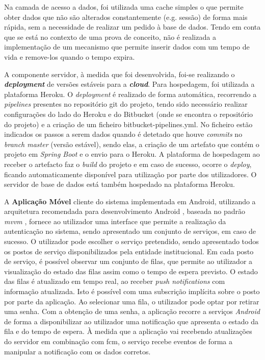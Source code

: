 {Na camada de acesso a dados, foi utilizada uma cache simples o que permite obter dados que não são alterados constantemente (e.g. sessão) de forma mais rápida, sem a necessidade de realizar um pedido à base de dados. Tendo em conta que se está no contexto de uma prova de conceito, não é realizada a implementação de um mecanismo que permite inserir dados com um tempo de vida e remove-los quando o tempo expira. 

A componente servidor, à medida que foi desenvolvida, foi-se realizando o \textbf{\textit{deployment}} de versões estáveis para a \textbf{\textit{cloud}}. Para hospedagem, foi utilizada a plataforma Heroku. O \textit{deployment} é realizado de forma automática, recorrendo a \textit{pipelines} presentes no repositório git do projeto, tendo sido necessário realizar configurações do lado do Heroku e do Bitbucket (onde se encontra o repositório do projeto) e a criação de um ficheiro bitbucket-pipelines.yml. No ficheiro estão indicados os passos a serem dados quando é detetado que houve \textit{commits} no \textit{branch master} (versão estável), sendo elas, a criação de um artefato que contém o projeto em \textit{Spring Boot} e o envio para o Heroku. A plataforma de hospedagem ao receber o artefacto faz o \textit{build} do projeto e em caso de sucesso, ocorre o \textit{deploy}, ficando automaticamente disponível para utilização por parte dos utilizadores. O servidor de base de dados está também hospedado na plataforma Heroku.

A \textbf{Aplicação Móvel} cliente do sistema implementada em Android, utilizando a arquitetura recomendada para desenvolvimento Android \cite{androidrecomm}, baseada no padrão \textit{\acrfull{mvvm}} \cite{mvvm}, fornece ao utilizador uma interface que permite a realização da autenticação no sistema, sendo apresentado um conjunto de serviços, em caso de sucesso. O utilizador pode escolher o serviço pretendido, sendo apresentado todos os postos de serviço disponibilizados pela entidade institucional. Em cada posto de serviço, é possível observar um conjunto de filas, que permite ao utilizador a visualização do estado das filas assim como o tempo de espera previsto. O estado das filas é atualizado em tempo real, ao receber \textit{push notifications} com informação atualizada. Isto é possível com uma subscrição implícita sobre o posto por parte da aplicação. Ao selecionar uma fila, o utilizador pode optar por retirar uma senha. Com a obtenção de uma senha, a aplicação recorre a serviços \textit{Android} de forma a disponibilizar ao utilizador uma notificação que apresenta o estado da fila e do tempo de espera. À medida que a aplicação vai recebendo atualizações do servidor em combinação com \acrshort{fcm}, o serviço recebe eventos de forma a manipular a notificação com os dados corretos.

}
